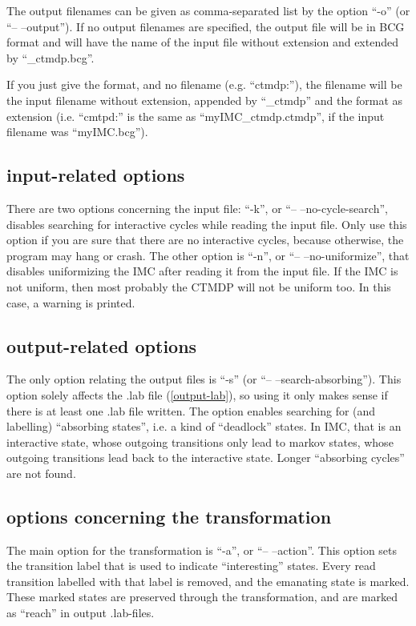 \documentclass[a4paper,11pt]{scrartcl}
\newcommand{\dd}{-- --}
\begin{document}
The output filenames can be given as comma-separated list by the option ``-o''
(or ``\dd output'').
If no output filenames are specified, the output file will be in BCG format
and will have the name of the input file without extension and extended by
``\_ctmdp.bcg''.

If you just give the format, and no filename (e.g. ``ctmdp:''), the filename
will be the input filename without extension, appended by ``\_ctmdp'' and the
format as extension (i.e. ``cmtpd:'' is the same as ``myIMC\_ctmdp.ctmdp'',
if the input filename was ``myIMC.bcg'').

\subsection{\label{sec:input-options}input-related options}

There are two options concerning the input file: ``-k'', or ``\dd no-cycle-search'',
disables searching for interactive cycles while reading the input file.
Only use this option if you are sure that there are no interactive cycles,
because otherwise, the program may hang or crash.
The other option is ``-n'', or ``\dd no-uniformize'', that disables uniformizing the
IMC after reading it from the input file. If the IMC is not uniform, then
most probably the CTMDP will not be uniform too. In this case, a warning is
printed.

\subsection{\label{sec:output-options}output-related options}

The only option relating the output files is ``-s'' (or ``\dd search-absorbing'').
This option solely affects the .lab file (\ref{output-lab}), so using it only
makes sense if there is at least one .lab file written.
The option enables searching for (and labelling) ``absorbing states'', i.e.
a kind of ``deadlock'' states. In IMC, that is an interactive state, whose
outgoing transitions only lead to markov states, whose outgoing transitions
lead back to the interactive state. Longer ``absorbing cycles'' are not found.

\subsection{\label{sec:transformation-options}options concerning the transformation}

The main option for the transformation is ``-a'', or ``\dd action''. This option sets
the transition label that is used to indicate ``interesting'' states. Every
read transition labelled with that label is removed, and the emanating state
is marked. These marked states are preserved through the transformation, and
are marked as ``reach'' in output .lab-files.
\end{document}
